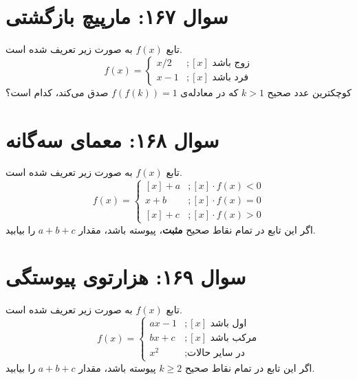 \documentclass[12pt]{article}
\begin{document}
\vspace{1cm}
\hrulefill
\vspace{1cm}

\section*{سوال ۱۶۷: مارپیچ بازگشتی}
تابع \(f(x)\) به صورت زیر تعریف شده است.
\begin{displaymath}
	f(x) = 
	\begin{cases}
		x/2 & ;  [x] \text{ زوج باشد} \\
		x-1 & ; [x] \text{ فرد باشد}
	\end{cases}
\end{displaymath}
کوچکترین عدد صحیح \(k>1\) که در معادله‌ی \( f(f(k)) = 1 \) صدق می‌کند، کدام است؟

\vspace{1cm}
\hrulefill
\vspace{1cm}

\section*{سوال ۱۶۸: معمای سه‌گانه}
تابع \(f(x)\) به صورت زیر تعریف شده است.
\begin{displaymath}
	f(x) = 
	\begin{cases}
		[x] + a & ; [x]\cdot f(x) < 0 \\
		x+b & ;  [x]\cdot f(x) = 0 \\
		[x]+c & ;  [x]\cdot f(x) > 0
	\end{cases}
\end{displaymath}
اگر این تابع در تمام نقاط صحیح \textbf{مثبت}، پیوسته باشد، مقدار \(a+b+c\) را بیابید.

\vspace{1cm}
\hrulefill
\vspace{1cm}

\section*{سوال ۱۶۹: هزارتوی پیوستگی}
تابع \(f(x)\) به صورت زیر تعریف شده است.
\begin{displaymath}
	f(x) = 
	\begin{cases}
		ax-1 & ;  [x] \text{ اول باشد} \\
		bx+c & ;  [x] \text{ مرکب باشد} \\
		x^2 & ; \text{در سایر حالات}
	\end{cases}
\end{displaymath}
اگر این تابع در تمام نقاط صحیح \( k \ge 2 \) پیوسته باشد، مقدار \(a+b+c\) را بیابید.
\end{document}
